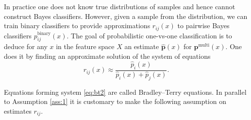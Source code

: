 In practice one does not  know true distributions of samples and hence cannot 
construct Bayes classifiers. However, given a sample from the distribution, 
we can train binary classifiers to provide approximations $r_{ij}(x)$ to 
pairwise Bayes classifiers $p_{ij}^\textrm{binary}(x)$. The goal of probabilistic
one-vs-one classification is to deduce for any $x$ in the feature space $X$ an 
estimate $\hat{\boldsymbol{p}}(x)$ for $\boldsymbol{p}^\textrm{multi}(x)$. 
One does it by finding an approximate solution of the system of equations
%
%
%
%
%
%
%
%
\begin{equation}
	{r}_{ij}(x) \approx \frac {\hat p_i(x)}{\hat p_i(x) + \hat p_j(x)}. \label{eq:bt2}
\end{equation}


Equations forming system \eqref{eq:bt2} are called Bradley--Terry equations. In parallel to Assumption \ref{ass:1} it is customary to make the following assumption on estimates $r_{ij}$.

